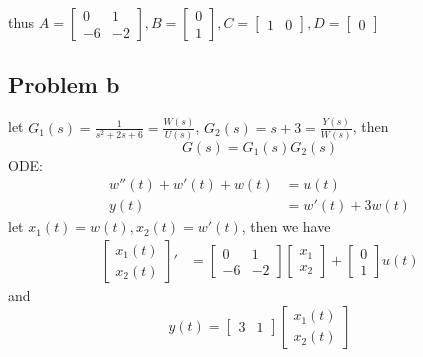 \documentclass[12pt,a4paper]{article}
\begin{document}
thus
$
    A =
    \begin{bmatrix}
        0  & 1  \\
        -6 & -2
    \end{bmatrix},
    B =
    \begin{bmatrix}
        0 \\
        1
    \end{bmatrix},
    C = \begin{bmatrix}
        1 & 0
    \end{bmatrix},
    D =
    \begin{bmatrix}
        0
    \end{bmatrix}
$

\subsection*{Problem b}
let $G_1(s)=\frac{1}{s^2+2s+6}=\frac{W(s)}{U(s)}$, $G_2(s)=s+3=\frac{Y(s)}{W(s)}$, then
\[G(s)  = G_1(s)G_2(s) \]
ODE:
\begin{equation}
    \begin{aligned}
        w''(t) + w'(t) + w(t) & = u(t)    \\
        y(t)            & = w'(t) + 3w(t)
    \end{aligned}
\end{equation}
let $ x_1(t) = w(t), x_2(t) = w'(t)$, then we have
\begin{equation}
    \begin{aligned}
        \begin{bmatrix}
            {x_1(t)} \\
            {x_2(t)}
        \end{bmatrix}' & = \begin{bmatrix}
                               0  & 1  \\
                               -6 & -2
                           \end{bmatrix} \begin{bmatrix}
                                             x_1 \\
                                             x_2
                                         \end{bmatrix} + \begin{bmatrix}
                                                             0 \\
                                                             1
                                                         \end{bmatrix} u(t)
    \end{aligned}
\end{equation}
and
\[ y(t) = \begin{bmatrix}
        3 & 1
    \end{bmatrix} \begin{bmatrix}
                      x_1(t) \\
                      x_2(t)
                  \end{bmatrix} \]
\end{document}

